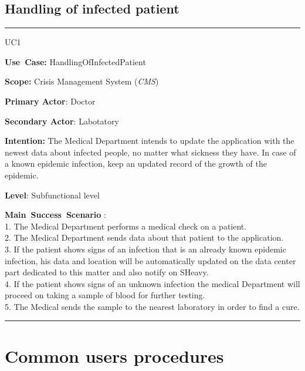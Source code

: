 \subsection{Handling of infected patient}
\vspace{0.5cm}
\hrule
\vspace{0.5cm}
\begin{lyxlist}{UC1}
\small{
\item [\textbf{Use~Case:}] HandlingOfInfectedPatient
\item [\textbf{Scope:}] Crisis Management System (\emph{CMS})
\item [\textbf{Primary Actor}:] Doctor
\item [\textbf{Secondary Actor}:] Labotatory
\item [\textbf{Intention:}]The Medical Department intends to update
the application with the newest data about infected people, no matter what
sickness they have. In case of a known epidemic infection, keep an updated
record of the growth of the epidemic.
\item [\textbf{Level}:]Subfunctional level
\item [\textbf{Main~Success~Scenario}]:\\
1. The Medical Department performs a medical check on a patient.\\
2. The Medical Department sends data about that patient to the application.\\
3. If the patient shows signs of an infection that is an already known epidemic infection, his data
and location will be automatically updated on the data center part dedicated to
this matter and also notify on SHeavy.\\
4. If the patient shows signs of an unknown infection the medical Department
will proceed on taking a sample of blood for further testing.\\
5. The Medical sends the sample to the nearest laboratory in order to find a
cure.\\
}
\end{lyxlist}
\hrule
\vspace{0.5cm} 

\section{Common users procedures}

